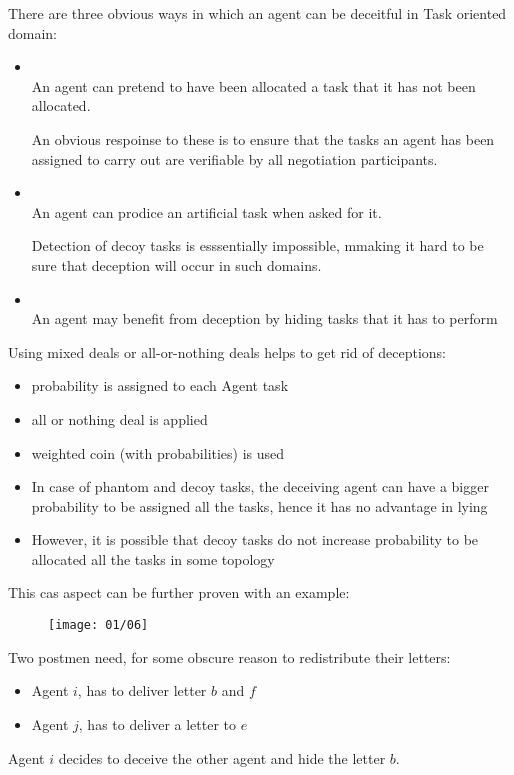 There are three obvious ways in which an agent can be deceitful in Task oriented domain:
\begin{itemize}
\item {}\\
An agent can pretend to have been allocated a task that it has not been allocated.

An obvious respoinse to these is to ensure that the tasks an agent has been assigned to carry out are verifiable by all negotiation participants.
\item {}\\
An agent can prodice an artificial task when asked for it.

Detection of decoy tasks is esssentially impossible, mmaking it hard to be sure that deception will occur in such domains.
\item {}\\
An agent may benefit from deception by hiding tasks that it has to perform
\end{itemize}
Using mixed deals or all-or-nothing deals helps to get rid of deceptions:
\begin{itemize}
\item probability is assigned to each Agent task
\item all or nothing deal is applied
\item weighted coin (with probabilities) is used
\item In case of phantom and decoy tasks, the deceiving agent can have a bigger probability to be assigned all the tasks, hence it has no advantage in lying
\item However, it is possible that decoy tasks do not increase probability to be allocated all the tasks in some topology
\end{itemize}

This cas aspect can be further proven with an example:
\begin{figure}[!h]
\centering
\texttt{[image: 01/06]}
\end{figure}
Two postmen need, for some obscure reason to redistribute their letters:
\begin{itemize}
\item Agent $i$, has to deliver letter $b$ and $f$
\item Agent $j$, has to deliver a letter to $e$
\end{itemize}
Agent $i$ decides to deceive the other agent and hide the letter $b$.


